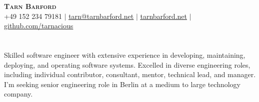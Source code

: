 \documentclass[letterpaper,11pt]{article}
\begin{document}
\begin{center}
    \textbf{\Huge \scshape Tarn Barford} \\ \vspace{1pt}
    \small +49 152 234 79181 $|$
    \href{mailto:tarn@tarnbarford.net}{\uline{tarn@tarnbarford.net}} $|$
    \href{https://tarnbarford.net}{\uline{tarnbarford.net}} $|$
    \href{https://github.com/tarnacious}{\uline{github.com/tarnacious}}
\end{center}

\section*{}
  \small { Skilled software engineer with extensive experience in developing, maintaining, deploying, and operating software systems. Excelled in diverse engineering roles, including individual contributor, consultant, mentor, technical lead, and manager. I'm seeking senior engineering role in Berlin at a medium to large technology company. }
\end{document}
